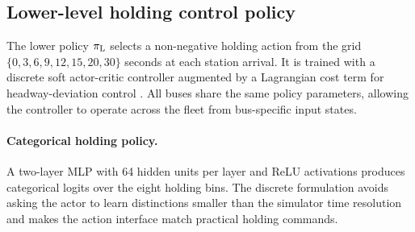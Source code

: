 \subsection{Lower-level holding control policy}
\label{sec:lower}

The lower policy $\pi_{\mathrm{L}}$ selects a non-negative holding action from the grid $\{0,3,6,9,12,15,20,30\}$ seconds at each station arrival.
It is trained with a discrete soft actor-critic controller augmented by a Lagrangian cost term for headway-deviation control \citep{haarnoja2018soft}.
All buses share the same policy parameters, allowing the controller to operate across the fleet from bus-specific input states.

\paragraph{Categorical holding policy.}
A two-layer MLP with 64 hidden units per layer and ReLU activations produces categorical logits over the eight holding bins. The discrete formulation avoids asking the actor to learn distinctions smaller than the simulator time resolution and makes the action interface match practical holding commands.

